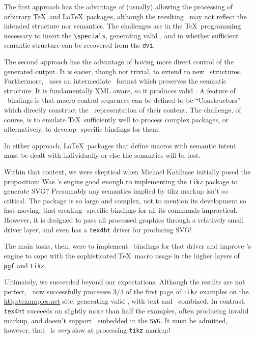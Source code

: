 \documentclass{llncs}
\def\SVG{\texttt{SVG}\xspace}
\begin{document}
The first approach has the advantage of (usually)
allowing the processing of arbitrary \TeX\ and \LaTeX\ packages,
although the resulting \HTML\ may not reflect the intended
structure nor semantics.
The challenges are in the \TeX\ programming necessary to
insert the \verb|\specials|, generating valid \HTML,
and in whether sufficient semantic structure can be
recovered from the \texttt{dvi}.

The second approach has the advantage of having more
direct control of the generated output.
It is easier, though not trivial, to extend to new
\XML\ structures.  Furthermore, \LaTeXML\
uses an intermediate \XML\ format which preserves
the semantic structure. It is fundamentally XML aware, so it produces valid \XML.
A feature of \LaTeXML\ bindings is that macro
control sequences can be defined to be ``Constructors''
which directly construct the \XML\ representation
of their content.
The challenge, of course, is to emulate \TeX\ sufficiently well to
process complex packages, or alternatively, to
develop \LaTeXML-specific bindings for them.

In either approach, \LaTeX\ packages that define
macros with semantic intent must be dealt with
individually or else the semantics will be lost.

Within that context, we were skeptical when Michael Kohlhase
initially posed the proposition: Was \LaTeXML's engine good
enough to implementing the \texttt{tikz} package to generate SVG?
Presumably any semantics implied by tikz markup isn't so critical.
The package is so large and complex, not to mention
its development so fast-moving, that creating \LaTeXML-specific
bindings for all its commands impractical.  However,
it is designed to pass all processed graphics through
a relatively small driver layer, and even has a \texttt{tex4ht} driver for producing SVG!

The main tasks, then, were to implement \LaTeXML\ bindings
for that driver and improve \LaTeXML's engine to cope
with the sophisticated \TeX\ macro usage in the higher
layers of \texttt{pgf} and \texttt{tikz}.

Ultimately, we succeeded beyond our expectations.
Although the results are not perfect,
\LaTeXML\ now successfully processes 3/4 of the
first page of \texttt{tikz} examples on the
\url{http:texamples.net} site, generating valid
, with text and \MathML\ combined.
In contrast, \texttt{tex4ht} succeeds on slightly more
than half the examples, often producing invalid markup,
and doesn't support \MathML\ embedded in the \SVG.
It must be admitted, however, that \LaTeXML\ is \emph{very}
slow at processing \texttt{tikz} markup!
\end{document}
